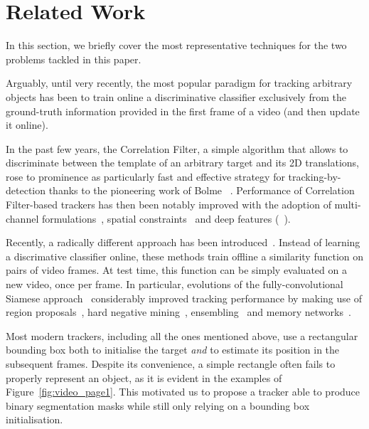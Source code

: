 \section{ Related Work}
\label{sec:related}
In this section, we briefly cover the most representative techniques for the two problems tackled in this paper.

Arguably, until very recently, the most popular paradigm for tracking arbitrary objects has been to train online a discriminative classifier exclusively from the ground-truth information provided in the first frame of a video (and then update it online).

In the past few years, the Correlation Filter, a simple algorithm that allows to discriminate between the template of an arbitrary target and its 2D translations, rose to prominence as particularly fast and effective strategy for tracking-by-detection thanks to the pioneering work of Bolme \etal~\cite{bolme2010visual}.
Performance of Correlation Filter-based trackers has then been notably improved with the adoption of multi-channel formulations~\cite{kiani2013multi,henriques2015tracking}, spatial constraints~\cite{kiani2015correlation,danelljan2015learning,lukezic2017discriminative,li2018learning} and deep features (\eg~\cite{danelljan2017eco,valmadre2017end}). 

Recently, a radically different approach has been introduced~\cite{bertinetto2016fully,held2016learning,tao2016siamese}. 
Instead of learning a discrimative classifier online, these methods train offline a similarity function on pairs of video frames.
At test time, this function can be simply evaluated on a new video, once per frame.
In particular, evolutions of the fully-convolutional Siamese approach~\cite{bertinetto2016fully} considerably improved tracking performance by making use of region proposals~\cite{SiamRPN}, hard negative mining~\cite{zhu2018distractor}, ensembling~\cite{he2018towards} and memory networks~\cite{yang2018learning}.

Most modern trackers, including all the ones mentioned above, use a rectangular bounding box both to initialise the target \emph{and} to estimate its position in the subsequent frames.
Despite its convenience, a simple rectangle often fails to properly represent an object, as it is evident in the examples of Figure~\ref{fig:video_page1}.
This motivated us to propose a tracker able to produce binary segmentation masks while still only relying on a bounding box initialisation.

